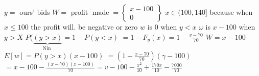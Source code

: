 $y=$ ours' bids
$W=$ profit $\operatorname{made}=\left\{\begin{array}{c}x-100 \\ 0\end{array}\right\}$
$x \in(100,140]$ because when $x \leqslant 100$ the profit will.
be negative or zero
$w$ is 0 when $y<x$
$\omega$ is $x-100$ when $y>X$
$P(\underbrace{(y>x)}_{\text {Nin }}=1-P(y<x)$
$=1-F_{y}(x)=1-\frac{v-70}{70}$
$W=x-100$
$E[w]=P(y>x)(x-100)$
$=\left(1-\frac{x-70}{70}\right)(\gamma-100)$
$=x-100-\frac{(x-70)(x-100)}{70}=v-100-\frac{x^{2}}{10}+\frac{170 x}{10}-\frac{7000}{70}$